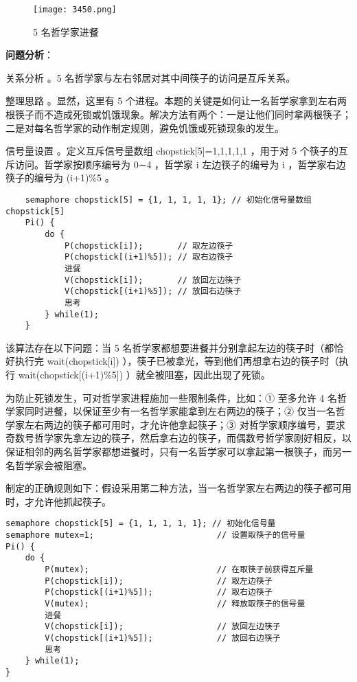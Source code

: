 \documentclass{ctexbook}
\begin{document}
\begin{figure}[h]
	\centering
	\texttt{[image: 3450.png]}
	\caption{5 名哲学家进餐}
	\label{fig:philosophers_dining}
\end{figure}

\textbf{问题分析}：

关系分析 。5 名哲学家与左右邻居对其中间筷子的访问是互斥关系。

整理思路 。显然，这里有 5 个进程。本题的关键是如何让一名哲学家拿到左右两根筷子而不造成死锁或饥饿现象。解决方法有两个：一是让他们同时拿两根筷子；二是对每名哲学家的动作制定规则，避免饥饿或死锁现象的发生。

信号量设置 。定义互斥信号量数组 chopstick[5]={1,1,1,1,1} ，用于对 5 个筷子的互斥访问。哲学家按顺序编号为 0∼4 ，哲学家 i 左边筷子的编号为 i ，哲学家右边筷子的编号为 (i+1)\%5 。

\begin{lstlisting}
	semaphore chopstick[5] = {1, 1, 1, 1, 1}; // 初始化信号量数组 chopstick[5]
	Pi() {
		do {
			P(chopstick[i]);       // 取左边筷子
			P(chopstick[(i+1)%5]); // 取右边筷子
			进餐
			V(chopstick[i]);       // 放回左边筷子
			V(chopstick[(i+1)%5]); // 放回右边筷子
			思考
		} while(1);
	}
\end{lstlisting}

该算法存在以下问题：当 5 名哲学家都想要进餐并分别拿起左边的筷子时（都恰好执行完 wait(chopstick[i]) ），筷子已被拿光，等到他们再想拿右边的筷子时（执行 wait(chopstick[(i+1)\%5]) ）就全被阻塞，因此出现了死锁。

为防止死锁发生，可对哲学家进程施加一些限制条件，比如：① 至多允许 4 名哲学家同时进餐，以保证至少有一名哲学家能拿到左右两边的筷子；② 仅当一名哲学家左右两边的筷子都可用时，才允许他拿起筷子；③ 对哲学家顺序编号，要求奇数号哲学家先拿左边的筷子，然后拿右边的筷子，而偶数号哲学家刚好相反，以保证相邻的两名哲学家都想进餐时，只有一名哲学家可以拿起第一根筷子，而另一名哲学家会被阻塞。

制定的正确规则如下：假设采用第二种方法，当一名哲学家左右两边的筷子都可用时，才允许他抓起筷子。

\begin{lstlisting}
semaphore chopstick[5] = {1, 1, 1, 1, 1}; // 初始化信号量
semaphore mutex=1;                         // 设置取筷子的信号量
Pi() {
	do {
		P(mutex);                          // 在取筷子前获得互斥量
		P(chopstick[i]);                   // 取左边筷子
		P(chopstick[(i+1)%5]);             // 取右边筷子
		V(mutex);                          // 释放取筷子的信号量
		进餐
		V(chopstick[i]);                   // 放回左边筷子
		V(chopstick[(i+1)%5]);             // 放回右边筷子
		思考
	} while(1);
}
\end{lstlisting}
\end{document}
